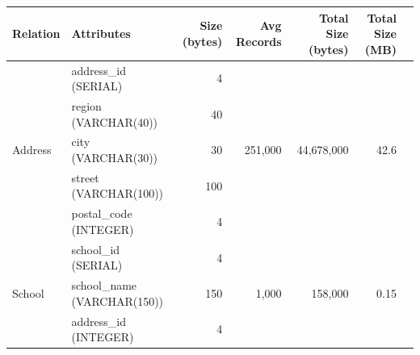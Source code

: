 \documentclass[a4paper]{article}
\begin{document}
\begin{longtable}{|l|p{2cm}|r|r|r|r|r|}
      \hline
      \textbf{Relation} & \textbf{Attributes}            & \textbf{Size (bytes)} & \textbf{Avg Records}       & \textbf{Total Size (bytes)}   & \textbf{Total Size (MB)} \\ \hline
      \endhead

      \multirow{5}{*}{Address}
                        & address\_id (SERIAL)           & 4                     & \multirow{5}{*}{251,000}   & \multirow{5}{*}{44,678,000}   & \multirow{5}{*}{42.6}    \\
                        & region (VARCHAR(40))           & 40                    &                            &                               &                          \\
                        & city (VARCHAR(30))             & 30                    &                            &                               &                          \\
                        & street (VARCHAR(100))          & 100                   &                            &                               &                          \\
                        & postal\_code (INTEGER)         & 4                     &                            &                               &                          \\ \hline

      \multirow{3}{*}{School}
                        & school\_id (SERIAL)            & 4                     & \multirow{3}{*}{1,000}     & \multirow{3}{*}{158,000}      & \multirow{3}{*}{0.15}    \\
                        & school\_name (VARCHAR(150))    & 150                   &                            &                               &                          \\
                        & address\_id (INTEGER)          & 4                     &                            &                               &                          \\ \hline


\end{longtable}
\end{document}
